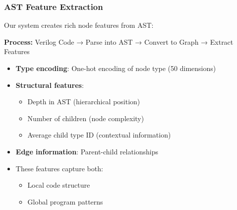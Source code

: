 \documentclass[aspectratio=169]{beamer}
\begin{document}
\begin{frame}
\frametitle{AST Feature Extraction}
Our system creates rich node features from AST:


\textbf{Process:} Verilog Code → Parse into AST → Convert to Graph → Extract Features

\begin{itemize}
    \item \textbf{Type encoding}: One-hot encoding of node type (50 dimensions)
    \item \textbf{Structural features}:
    \begin{itemize}
        \item Depth in AST (hierarchical position)
        \item Number of children (node complexity)
        \item Average child type ID (contextual information)
    \end{itemize}
    \item \textbf{Edge information}: Parent-child relationships
    \item These features capture both:
    \begin{itemize}
        \item Local code structure
        \item Global program patterns
    \end{itemize}
\end{itemize}
\end{frame}
\end{document}
